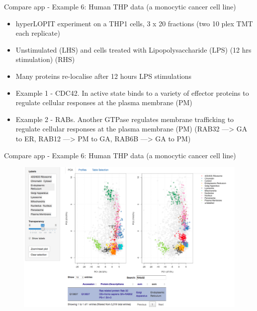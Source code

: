 \documentclass[bigger]{beamer}
\begin{document}
\begin{frame}{Compare app - Example 6: Human THP data (a monocytic cancer cell line)}
\smallskip
\footnotesize {
  \begin{itemize}
  \item hyperLOPIT experiment on a THP1 cells, 3 x 20 fractions (two 10 plex TMT each replicate)
  \item Unstimulated (LHS) and cells treated with Lipopolysaccharide (LPS) (12 hrs stimulation) (RHS)
  \item Many proteins re-localise after 12 hours LPS stimulations
  \item Example 1 - CDC42. In active state binds to a variety of effector proteins to regulate cellular responses at the plasma membrane (PM)
  \item Example 2 - RABs. Another GTPase regulates membrane trafficking to regulate cellular responses at the plasma membrane (PM) (RAB32 --->  GA to ER, RAB12 --->  PM to GA, RAB6B --->  GA to PM)
    \end{itemize}
  }
\end{frame}


\begin{frame}{Compare app - Example 6: Human THP data (a monocytic cancer cell line)}
  \begin{figure}
      \includegraphics[width=1\linewidth]{Figures/demo6b-rab32-pca.png}
  \end{figure}
\end{frame}
\end{document}
